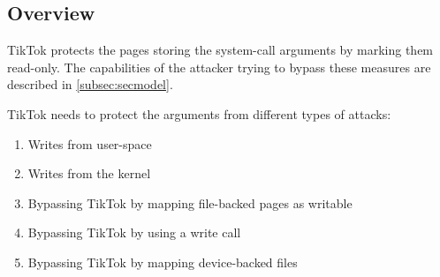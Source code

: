
\subsection{Overview}
\label{subsec:designoverview}

TikTok protects the pages storing the system-call arguments by marking them
read-only. The capabilities of the attacker trying to bypass these measures
are described in \cref{subsec:secmodel}.


TikTok needs to protect the arguments from different types of attacks:

\begin{enumerate}
  \item \label{first} Writes from user-space
  \item \label{second} Writes from the kernel
  \item \label{third} Bypassing TikTok by mapping file-backed pages as writable
  \item \label{fourth} Bypassing TikTok by using a write call
  \item \label{fifth} Bypassing TikTok by mapping device-backed files
\end{enumerate}


